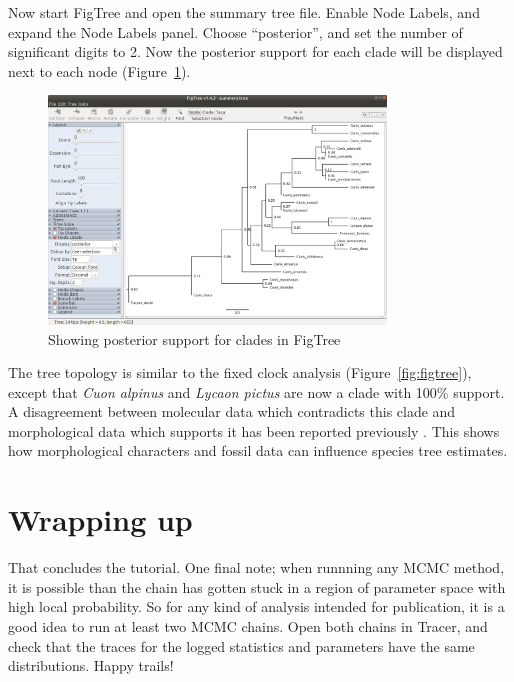 \documentclass[12pt]{article}
\begin{document}
Now start FigTree and open the summary tree file. Enable Node Labels,
and expand the Node Labels panel. Choose ``posterior'', and set
the number of significant digits to 2. Now the posterior support
for each clade will be displayed next to each node
(Figure~\ref{fig:figtreeFBD}).

\clearpage

\begin{figure}[htb!]
\centering
\includegraphics[width=0.8\textwidth]{figures/figtreeFBD.png}
\caption
{Showing posterior support for clades in FigTree}
\label{fig:figtreeFBD}
\end{figure}

The tree topology is similar to the fixed clock analysis
(Figure~\ref{fig:figtree}), except that \textit{Cuon alpinus} and
\textit{Lycaon pictus} are now a clade with 100\% support. A disagreement
between molecular data which contradicts this clade and morphological
data which supports it has been reported previously \citep{Zrzavy2004}. This shows
how morphological characters and fossil data can influence species tree
estimates.

\clearpage

\section{Wrapping up}

That concludes the tutorial. One final note; when runnning any MCMC method, it
is possible than the chain has gotten stuck in a region of parameter space
with high local probability. So for any kind of analysis intended for
publication, it is a good idea to run at least two MCMC chains. Open both
chains in Tracer, and check that the traces for the logged statistics and
parameters have the same distributions. Happy trails!



\end{document}
